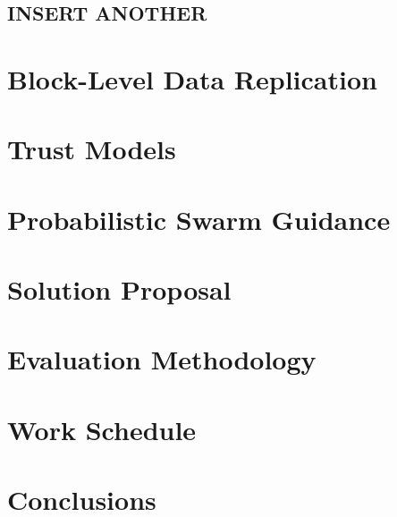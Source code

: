 \documentclass[runningheads]{llncs}
\begin{document}
\subsection{INSERT ANOTHER}
\section{Block-Level Data Replication}
\section{Trust Models}
\section{Probabilistic Swarm Guidance}

\newpage\section{Solution Proposal}\label{sec:proposal}

\section{Evaluation Methodology}\label{sec:methodology}

\section{Work Schedule}\label{sec:workschedule}

\section{Conclusions}\label{sec:conclusion}



\end{document}

